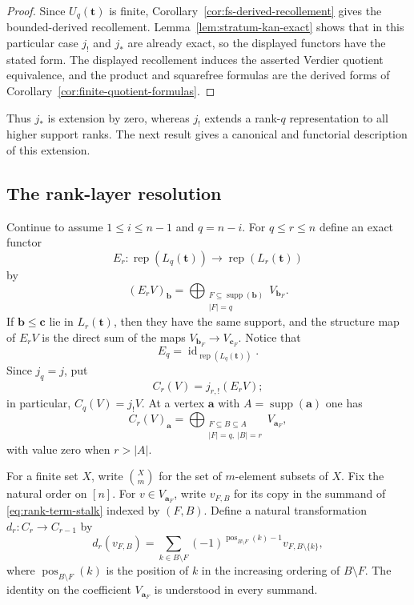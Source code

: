 \documentclass[12pt,reqno]{amsart}
\theoremstyle{definition}
\theoremstyle{remark}
\newcommand{\Rep}{\operatorname{rep}}
\begin{document}
\begin{proof}
Since $U_q(\mathbf t)$ is finite,
Corollary~\ref{cor:fs-derived-recollement} gives the bounded-derived
recollement.  Lemma~\ref{lem:stratum-kan-exact} shows that in this particular
case $j_!$ and $j_*$ are already exact, so the displayed functors have the
stated form.  The displayed recollement induces the asserted Verdier quotient
equivalence, and the product and squarefree formulas are the derived forms of
Corollary~\ref{cor:finite-quotient-formulas}.
\end{proof}

Thus $j_*$ is extension by zero, whereas $j_!$ extends a rank-$q$ representation to all higher support ranks.  The next result gives a canonical and functorial description of this extension.

\subsection{The rank-layer resolution}\label{subsec:rank-resolution}

Continue to assume $1\le i\le n-1$ and $q=n-i$.
For $q\le r\le n$ define an exact functor
\[
E_r:\Rep(L_q(\mathbf t))\longrightarrow\Rep(L_r(\mathbf t))
\]
by
\[
(E_rV)_{\mathbf b}
=
\bigoplus_{\substack{F\subseteq\operatorname{supp}(\mathbf b)\\|F|=q}}
V_{\mathbf b_F}.
\]
If $\mathbf b\le\mathbf c$ lie in $L_r(\mathbf t)$, then they have the same support, and the structure map of $E_rV$ is the direct sum of the maps
$V_{\mathbf b_F}\to V_{\mathbf c_F}$.  Notice that
\[
E_q=\operatorname{id}_{\Rep(L_q(\mathbf t))}.
\]
Since $j_q=j$, put
\[
C_r(V)=j_{r,!}(E_rV);
\]
in particular, $C_q(V)=j_!V$.
At a vertex $\mathbf a$ with $A=\operatorname{supp}(\mathbf a)$ one has
\begin{equation}\label{eq:rank-term-stalk}
C_r(V)_{\mathbf a}
=
\bigoplus_{\substack{F\subseteq B\subseteq A\\|F|=q,\ |B|=r}}
V_{\mathbf a_F},
\end{equation}
with value zero when $r>|A|$.

For a finite set $X$, write $\binom{X}{m}$ for the set of $m$-element
subsets of $X$.
Fix the natural order on $[n]$.  For $v\in V_{\mathbf a_F}$, write
$v_{F,B}$ for its copy in the summand of \eqref{eq:rank-term-stalk} indexed by
$(F,B)$.  Define a natural transformation $d_r:C_r\to C_{r-1}$ by
\begin{equation}\label{eq:rank-differential}
d_r(v_{F,B})
=
\sum_{k\in B\setminus F}
(-1)^{\operatorname{pos}_{B\setminus F}(k)-1}
v_{F,B\setminus\{k\}},
\end{equation}
where $\operatorname{pos}_{B\setminus F}(k)$ is the position of $k$ in the increasing ordering of $B\setminus F$.  The identity on the coefficient $V_{\mathbf a_F}$ is understood in every summand.
\end{document}
